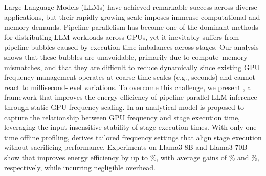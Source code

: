 



Large Language Models (LLMs) have achieved remarkable success across diverse applications, but their rapidly growing scale imposes immense computational and memory demands.
Pipeline parallelism has become one of the dominant methods for distributing LLM workloads across GPUs, yet it inevitably suffers from pipeline bubbles caused by execution time imbalances across stages.
Our analysis shows that these bubbles are unavoidable, primarily due to compute–memory mismatches, and that they are difficult to reduce dynamically since existing GPU frequency management operates at coarse time scales (e.g., seconds) and cannot react to millisecond-level variations. 
To overcome this challenge, we present \thisproj{}, a framework that improves the energy efficiency of pipeline-parallel LLM inference through static GPU frequency scaling.
In \thisproj{} an analytical model is proposed to capture the relationship between GPU frequency and stage execution time, leveraging the input-insensitive stability of stage execution times. 
With only one-time offline profiling, \thisproj{} derives tailored frequency settings that align stage execution without sacrificing performance. 
Experiments on Llama3-8B and Llama3-70B show that \thisproj{} improves energy efficiency by up to \%, with average gains of \% and \%, respectively, while incurring negligible overhead.
